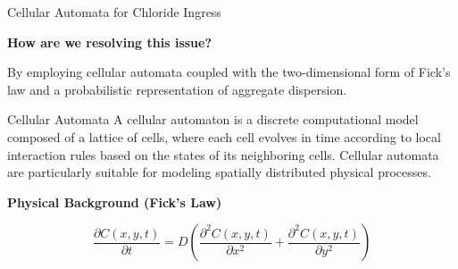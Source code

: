 \begin{frame}{Cellular Automata for Chloride Ingress}

\justifying

\textbf{How are we resolving this issue?}

By employing cellular automata coupled with the two-dimensional form of
Fick’s law and a probabilistic representation of aggregate dispersion.

\vspace{0.20cm}

\begin{block}{Cellular Automata} 
\justifying A cellular automaton is a discrete computational model composed of a lattice of cells, where each cell evolves in time according to local interaction rules based on the states of its neighboring cells. Cellular automata are particularly suitable for modeling spatially distributed physical processes. \end{block}

\vspace{0.20cm}

\textbf{Physical Background (Fick’s Law)}

\vspace{0.2cm}

\begin{equation}
\frac{\partial C(x,y,t)}{\partial t}
=
D
\left(
\frac{\partial^2 C(x,y,t)}{\partial x^2}
+
\frac{\partial^2 C(x,y,t)}{\partial y^2}
\right)
\label{eq:fick_2d}
\end{equation}

\end{frame}
